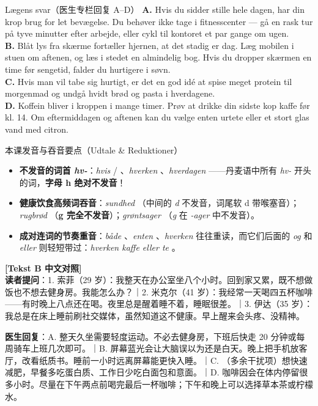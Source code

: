 \begin{emailbox}{Lægens svar（医生专栏回复 A--D）}
\textbf{A.} Hvis du sidder stille hele dagen, har din krop brug for let bevægelse. Du behøver ikke tage i fitnesscenter --- gå en rask tur på tyve minutter efter arbejde, eller cykl til kontoret et par gange om ugen.\\[3pt]
\textbf{B.} Blåt lys fra skærme fortæller hjernen, at det stadig er dag. Læg mobilen i stuen om aftenen, og læs i stedet en almindelig bog. Hvis du dropper skærmen en time før sengetid, falder du hurtigere i søvn.\\[3pt]
\textbf{C.} Hvis man vil tabe sig hurtigt, er det en god idé at spise meget protein til morgenmad og undgå hvidt brød og pasta i hverdagene.\\[3pt]
\textbf{D.} Koffein bliver i kroppen i mange timer. Prøv at drikke din sidste kop kaffe før kl. 14. Om eftermiddagen og aftenen kan du vælge enten urtete eller et stort glas vand med citron.
\end{emailbox}

\begin{tipbox}{本课发音与吞音要点（Udtale \& Reduktioner）}
\begin{itemize}
  \item \textbf{不发音的词首 \textit{hv-}}：\textit{hvis}  / 、\textit{hverken} 、\textit{hverdagen} ——丹麦语中所有 \textit{hv-} 开头的词，\textbf{字母 h 绝对不发音}！
  \item \textbf{健康饮食高频词吞音}：\textit{sundhed} （中间的 \textit{d} 不发音，词尾软 d 带喉塞音）；\textit{rugbrød} （\textbf{g 完全不发音}）；\textit{grøntsager} （\textit{g} 在 \textit{-ager} 中不发音）。
  \item \textbf{成对连词的节奏重音}：\textit{både} 、\textit{enten} 、\textit{hverken}  往往重读，而它们后面的 \textit{og}  和 \textit{eller}  则轻短带过：\textit{hverken kaffe eller te} 。
\end{itemize}
\end{tipbox}

\begin{transbox}
\small
\textbf{\color{NCDTeal}[Tekst B 中文对照]}\\
\textbf{读者提问}：1. 索菲（29 岁）：我整天在办公室坐八个小时。回到家又累，既不想做饭也不想去健身房。我能怎么办？｜2. 米克尔（41 岁）：我经常一天喝四五杯咖啡——有时晚上八点还在喝。夜里总是醒着睡不着，睡眠很差。｜3. 伊达（35 岁）：我总是在床上睡前刷社交媒体，虽然知道这不健康。早上醒来会头疼、没精神。

\textbf{医生回复}：A. 整天久坐需要轻度运动。不必去健身房，下班后快走 20 分钟或每周骑车上班几次即可。｜B. 屏幕蓝光会让大脑误以为还是白天。晚上把手机放客厅，改看纸质书。睡前一小时远离屏幕能更快入睡。｜C. （多余干扰项）想快速减肥，早餐多吃蛋白质、工作日少吃白面包和意面。｜D. 咖啡因会在体内停留很多小时。尽量在下午两点前喝完最后一杯咖啡；下午和晚上可以选择草本茶或柠檬水。
\end{transbox}

